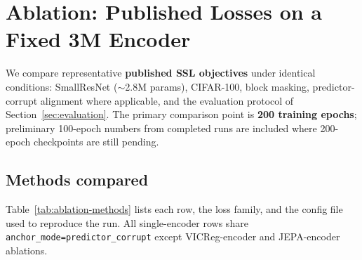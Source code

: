\section{Ablation: Published Losses on a Fixed 3M Encoder}
\label{sec:ablation}

We compare representative \textbf{published SSL objectives} under identical
conditions: SmallResNet ($\sim$2.8M params), CIFAR-100, block masking,
predictor-corrupt alignment where applicable, and the evaluation protocol of
Section~\ref{sec:evaluation}.
The primary comparison point is \textbf{200 training epochs}; preliminary
100-epoch numbers from completed runs are included where 200-epoch checkpoints
are still pending.

\subsection{Methods compared}
\label{sec:ablation-methods}

Table~\ref{tab:ablation-methods} lists each row, the loss family, and the
config file used to reproduce the run.
All single-encoder rows share \texttt{anchor\_mode=predictor\_corrupt} except
VICReg-encoder and JEPA-encoder ablations.

